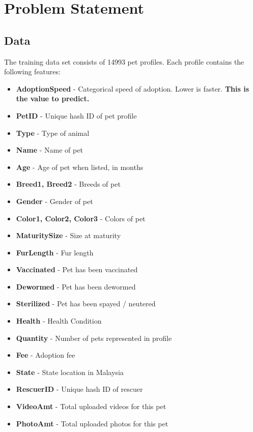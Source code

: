 \section{Problem Statement}

\subsection{Data}
The training data set consists of 14993 pet profiles. Each profile contains the following features: 
\begin{itemize}
    \item \textbf{AdoptionSpeed} - Categorical speed of adoption. Lower is faster. \textbf{This is the value to predict.}
    \item \textbf{PetID} - Unique hash ID of pet profile
    \item \textbf{Type} - Type of animal 
    \item \textbf{Name} - Name of pet 
    \item \textbf{Age} - Age of pet when listed, in months
    \item \textbf{Breed1, Breed2} - Breeds of pet 
    \item \textbf{Gender} - Gender of pet 
    \item \textbf{{Color1, Color2, Color3}} - Colors of pet 
    \item \textbf{MaturitySize} - Size at maturity 
    \item \textbf{FurLength} - Fur length 
    \item \textbf{Vaccinated} - Pet has been vaccinated
    \item \textbf{Dewormed} - Pet has been dewormed 
    \item \textbf{Sterilized} - Pet has been spayed / neutered 
    \item \textbf{Health} - Health Condition 
    \item \textbf{Quantity} - Number of pets represented in profile
    \item \textbf{Fee} - Adoption fee 
    \item \textbf{State} - State location in Malaysia 
    \item \textbf{RescuerID} - Unique hash ID of rescuer
    \item \textbf{VideoAmt} - Total uploaded videos for this pet
    \item \textbf{PhotoAmt} - Total uploaded photos for this pet
\end{itemize}

